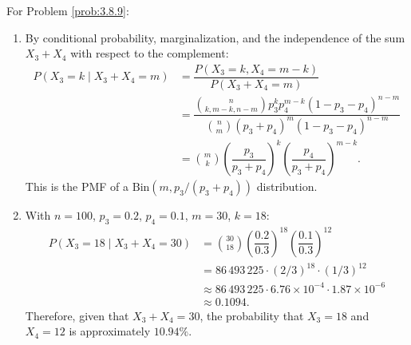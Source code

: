 \begin{solucion}
	\label{sol:3.8.9}
	For Problem \ref{prob:3.8.9}:
	\begin{enumerate}
		\item By conditional probability, marginalization, and the independence of the sum $X_{3} + X_{4}$ with respect to the complement:
		\begin{align*}
			P(X_{3} = k \mid X_{3} + X_{4} = m) &= \dfrac{P(X_{3} = k, X_{4} = m-k)}{P(X_{3} + X_{4} = m)} \\
			&= \dfrac{\binom{n}{k, m-k, n-m} p_{3}^{k} p_{4}^{m-k} (1 - p_{3} - p_{4})^{n-m}}{\binom{n}{m} (p_{3} + p_{4})^{m} (1 - p_{3} - p_{4})^{n-m}} \\
			&= \binom{m}{k} \left(\dfrac{p_{3}}{p_{3} + p_{4}}\right)^{k} \left(\dfrac{p_{4}}{p_{3} + p_{4}}\right)^{m-k}.
		\end{align*}
		This is the PMF of a $\text{Bin}(m, p_{3}/(p_{3}+p_{4}))$ distribution.
		\item With $n = 100$, $p_{3} = 0.2$, $p_{4} = 0.1$, $m = 30$, $k = 18$:
		\begin{align*}
			P(X_{3} = 18 \mid X_{3} + X_{4} = 30) &= \binom{30}{18} \left(\dfrac{0.2}{0.3}\right)^{18} \left(\dfrac{0.1}{0.3}\right)^{12} \\
			&= 86\,493\,225 \cdot (2/3)^{18} \cdot (1/3)^{12} \\
			&\approx 86\,493\,225 \cdot 6.76 \times 10^{-4} \cdot 1.87 \times 10^{-6} \\
			&\approx 0.1094.
		\end{align*}
		Therefore, given that $X_{3} + X_{4} = 30$, the probability that $X_{3} = 18$ and $X_{4} = 12$ is approximately $10.94\%$.
	\end{enumerate}
\end{solucion}

